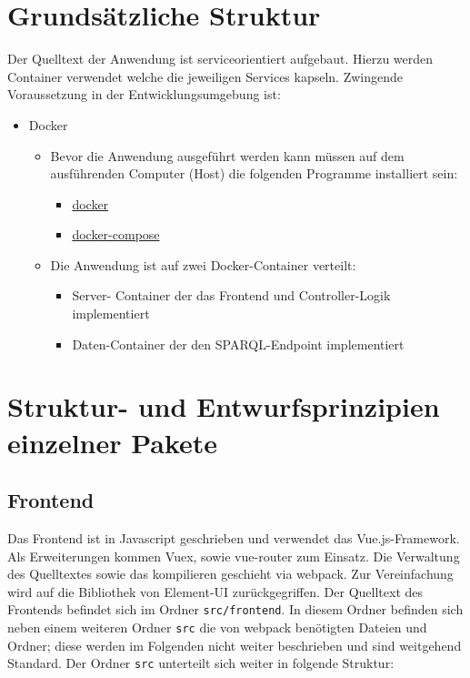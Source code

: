 \documentclass[a4paper,11pt,oneside, titlepage]{article}
\begin{document}
\section{Grundsätzliche Struktur}
Der Quelltext der Anwendung ist serviceorientiert aufgebaut. Hierzu werden Container verwendet welche die jeweiligen Services kapseln. Zwingende Voraussetzung in der Entwicklungsumgebung ist: 
\begin{itemize}
	\item Docker
	\begin{itemize}
		\item Bevor die Anwendung ausgeführt werden kann müssen auf dem ausführenden Computer (Host) die folgenden Programme installiert sein:
		\begin{itemize}
			\item \href{https://www.docker.com/get-docker}{docker}
			\item \href{https://docs.docker.com/compose/}{docker-compose} 
		\end{itemize}
		\item Die Anwendung ist auf zwei Docker-Container verteilt:
		\begin{itemize}
			\item Server-
			Container der das Frontend und Controller-Logik implementiert
			\item Daten-Container der den SPARQL-Endpoint implementiert
		\end{itemize}
		
	\end{itemize}	
\end{itemize}
\section{Struktur- und Entwurfsprinzipien einzelner Pakete}

  \subsection*{Frontend}
Das Frontend ist in \gls{Javascript} geschrieben und verwendet das \gls{Vue.js}-Framework. Als Erweiterungen kommen \gls{Vuex}, sowie \gls{vue-router} zum Einsatz. Die Verwaltung des Quelltextes sowie das kompilieren geschieht via \gls{webpack}. Zur Vereinfachung wird auf die Bibliothek von \gls{Element-UI} zurückgegriffen. Der Quelltext des Frontends befindet sich im Ordner \verb+src/frontend+. In diesem Ordner befinden sich neben einem weiteren Ordner \verb+src+ die von \gls{webpack} benötigten Dateien und Ordner; diese werden im Folgenden nicht weiter beschrieben und sind weitgehend Standard. Der Ordner \verb+src+ unterteilt sich weiter in folgende Struktur:
\end{document}
